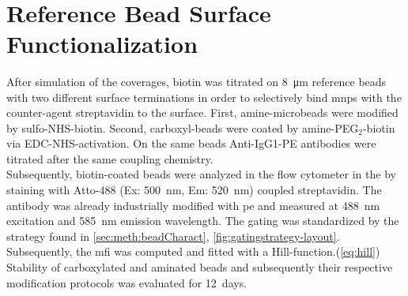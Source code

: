 \begin{figure}[htb!]
	\centering	
		\subfloat{
			\subfigimg[height=135 pt]{a}{Ressources/Simulation/Flow/150um_vel}	%
		} \hfill
		 \\
		\vspace{\baselineskip}
		 \hfill
	\label{fig:sim:flowShear}
\end{figure}

\clearpage
\section{Reference Bead Surface Functionalization}
After simulation of the coverages, biotin was titrated on \SI{8}{\micro\meter} reference beads with two different surface terminations in order to selectively bind \glspl{mnp} with the counter-agent streptavidin to the surface. First, \gls{amine}-microbeads were modified by sulfo-NHS-biotin. Second, \gls{carboxyl}-beads were coated by amine-PEG$_2$-biotin via EDC-NHS-activation. On the same beads Anti-IgG1-PE antibodies were titrated after the same coupling chemistry.\\
Subsequently, biotin-coated beads were analyzed in the flow cytometer in the by staining with Atto-488 (Ex: \SI{500}{\nano\meter}, Em: \SI{520}{\nano\meter}) coupled streptavidin. The antibody was already industrially modified with \gls{pe} and measured at \SI{488}{\nano\meter} excitation and \SI{585}{\nano\meter}  emission wavelength. The gating was standardized by the strategy found in \cref{sec:meth:beadCharact}, \cref{fig:gatingstrategy-layout}. Subsequently, the \gls{mfi} was computed and fitted with a Hill-function.(\cref{eq:hill}) Stability of carboxylated and aminated beads and subsequently their respective modification protocols was evaluated for \SI{12}{days}.


